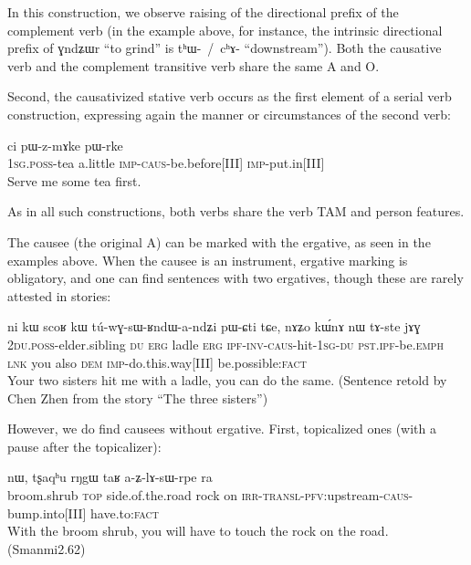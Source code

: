 \documentclass[oldfontcommands,oneside,a4paper,11pt]{article}
\newcommand{\ipa}[1]{{\phon \mbox{#1}}} %
\newcommand{\sg}{\textsc{sg}}
\newcommand{\jg}[1]{\ipa{#1}\index{Japhug #1}}
\newcommand{\wav}[1]{}%
\newcommand{\pfv}{\textsc{pfv}}
\newcommand{\caus}{\textsc{caus}}
\newcommand{\lnk}{\textsc{lnk}}
\newcommand{\dem}{\textsc{dem}}
\newcommand{\du}{\textsc{du}}
\newcommand{\erg}{\textsc{erg}}
\newcommand{\emphat}{\textsc{emph}}
\newcommand{\imp}{\textsc{imp}}
\newcommand{\inv}{\textsc{inv}}
\newcommand{\ipf}{\textsc{ipf}}
\newcommand{\irr}{\textsc{irr}}
\newcommand{\fact}{\textsc{fact}}
\newcommand{\poss}{\textsc{poss}}
\newcommand{\pst}{\textsc{pst}}
\newcommand{\topic}{\textsc{top}}
\newcommand{\transloc}{\textsc{transl}}
\begin{document}
In this construction, we observe raising of the directional prefix of the complement verb (in the example above, for instance, the intrinsic directional prefix of \jg{ɣndʑɯr} ``to grind'' is \ipa{tʰɯ- / cʰɤ-} ``downstream''). Both the causative verb and the complement transitive verb share the same A and O.

Second, the causativized stative verb occurs as the first element of a serial verb construction, expressing again the manner or circumstances of the second verb:

\begin{exe}
\ex
\gll \ipa{a-tʂʰa} 	\ipa{ci} 	\ipa{pɯ-z-mɤke} 	\ipa{pɯ-rke} \\
1\sg{}.\poss{}-tea a.little \imp{}-\caus{}-be.before[III] \imp{}-put.in[III] \\
\glt  Serve me some tea first.
\end{exe} 
As in all such constructions, both verbs share the verb TAM and person features.

 
The causee (the original A) can be marked with the ergative, as seen in the examples above. When the causee is an instrument, ergative marking is obligatory, and one can find sentences with two ergatives, though these are rarely attested in stories:
\begin{exe}
\ex
\gll \ipa{nɤ-pi} 	\ipa{ni} 	\ipa{kɯ} 	\ipa{scoʁ} 	\ipa{kɯ} 	\ipa{tú-wɣ-sɯ-ʁndɯ-a-ndʑi} 	\ipa{pɯ-ɕti} 	\ipa{tɕe,} 	\ipa{nɤʑo} 	\ipa{kɯ́nɤ} 	\ipa{nɯ} 	\ipa{tɤ-ste} 	\ipa{jɤɣ}  \\
2\du{}.\poss{}-elder.sibling \du{} \erg{} ladle \erg{} \ipf{}-\inv{}-\caus{}-hit-1\sg{}-\du{} \pst{}.\ipf{}-be.\emphat{} \lnk{} you also \dem{} \imp{}-do.this.way[III] be.possible:\fact{}  \\
\glt   Your two sisters hit me with a ladle, you can do the same. (Sentence retold by Chen Zhen from the story ``The three sisters'') \wav{8_scoRkW}
\end{exe} 


However, we do find  causees without ergative. First, topicalized ones (with a pause after the topicalizer):
\begin{exe}
\ex
\gll  \ipa{pʰuɲi} 	\ipa{nɯ}, 	\ipa{tʂaqʰu} 	\ipa{rŋgɯ} 	\ipa{taʁ} 	\ipa{a-ʑ-lɤ-sɯ-rpe} 	\ipa{ra}  \\
 broom.shrub \topic{} side.of.the.road rock on \irr{}-\transloc{}-\pfv{}:upstream-\caus{}-bump.into[III] have.to:\fact{}   \\
 \glt   With the broom shrub, you will have to touch the rock on the road. (Smanmi2.62)
\end{exe} 
 
\end{document}

